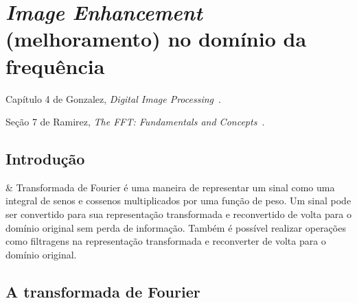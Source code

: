\chapter{\emph{Image Enhancement} (melhoramento) no domínio da frequência}

Capítulo 4 de Gonzalez, \textit{Digital Image Processing}~\cite{gonzalez2006image}.

\noindent
Seção 7 de Ramirez, \textit{The FFT: Fundamentals and Concepts}~\cite{ramirez1975fft}.

\section{Introdução}

\begin{easylist}

  & Transformada de Fourier é uma maneira de representar um sinal como uma integral de senos e cossenos multiplicados por uma função de peso. Um sinal pode ser convertido para sua representação transformada e reconvertido de volta para o domínio original sem perda de informação. Também é possível realizar operações como filtragens na representação transformada e reconverter de volta para o domínio original.

\end{easylist}
  
\section{A transformada de Fourier}

